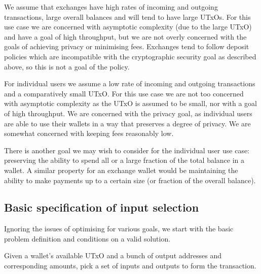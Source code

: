 \documentclass{article}
\theoremstyle{definition}{
  \newtheorem{lemma}{Lemma}[section] %
  \newtheorem{definition}[lemma]{Definition}
}
\theoremstyle{theorem}{
  \newtheorem{invariant}[lemma]{Invariant}
  \newtheorem{proofobligation}[lemma]{Proof Obligation}
}
\numberwithin{equation}{lemma}
\begin{document}
We assume that exchanges have high rates of incoming and outgoing transactions,
large overall balances and will tend to have large UTxOs. For this use case we
are concerned with asymptotic complexity (due to the large UTxO) and have a
goal of high throughput, but we are not overly concerned with the goals of
achieving privacy or minimising fees. Exchanges tend to follow deposit policies
which are incompatible with the cryptographic security goal as described above,
so this is not a goal of the policy.

For individual users we assume a low rate of incoming and outgoing transactions
and a comparatively small UTxO. For this use case we are not too concerned with
asymptotic complexity as the UTxO is assumed to be small, nor with a goal of
high throughput. We are concerned with the privacy goal, as individual users
are able to use their wallets in a way that preserves a degree of privacy. We
are somewhat concerned with keeping fees reasonably low.

There is another goal we may wish to consider for the individual user use case:
preserving the ability to spend all or a large fraction of the total balance in
a wallet. A similar property for an exchange wallet would be maintaining the
ability to make payments up to a certain size (or fraction of the overall
balance).

\subsection{Basic specification of input selection}

Ignoring the issues of optimising for various goals, we start with the basic
problem definition and conditions on a valid solution.

Given a wallet's available UTxO and a bunch of output addresses and corresponding
amounts, pick a set of inputs and outputs to form the transaction.
\end{document}
